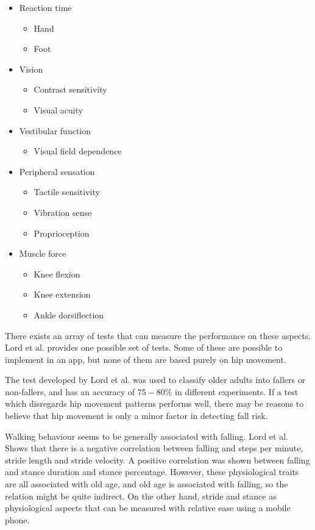 \begin{itemize}
\item Reaction time
\begin{itemize}
\item Hand
\item Foot
\end{itemize}
\item Vision
\begin{itemize}
\item Contrast sensitivity
\item Visual acuity
\end{itemize}
\item Vestibular function
\begin{itemize}
\item Visual field dependence
\end{itemize}
\item 
Peripheral sensation
\begin{itemize}
\item Tactile sensitivity
\item Vibration sense
\item Proprioception
\end{itemize}
\item Muscle force
\begin{itemize}
\item Knee flexion
\item Knee extension
\item Ankle dorsiflection
\end{itemize}
\end{itemize}


There exists an array of tests that can measure the performance on these aspects. Lord et al. provides one possible set of tests. Some of these are possible to implement in an app, but none of them are based purely on hip movement.

The test developed by Lord et al. was used to classify older adults into fallers or non-fallers, and has an accuracy of $75-80\%$ in different experiments.\cite{LMTassessPrev} If a test which disregards hip movement patterns performs well, there may be reasons to believe that hip movement is only a minor factor in detecting fall risk.  

Walking behaviour seems to be generally associated with falling. Lord et al. Shows that there is a negative correlation between falling and steps per minute, stride length and stride velocity. A positive correlation was shown between falling and stance duration and stance percentage. However, these physiological traits are all associated with old age, and old age is associated with falling, so the relation might be quite indirect. On the other hand, stride and stance as physiological aspects that can be measured with relative ease using a mobile phone.\cite{LLKgaitPatterns}